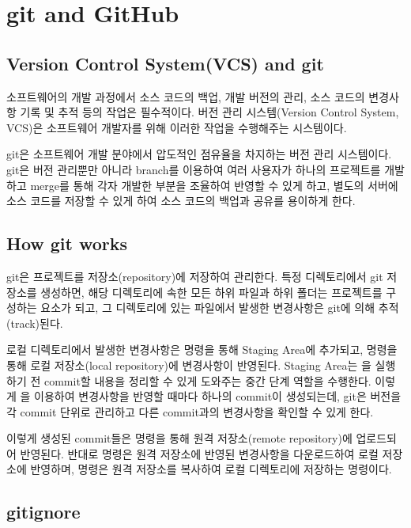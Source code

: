 \section{git and GitHub}\label{sect:git-and-github}

\subsection*{Version Control System(VCS) and git}

소프트웨어의 개발 과정에서 소스 코드의 백업, 개발 버전의 관리, 소스 코드의 변경사항 기록 및 추적 등의 작업은 필수적이다. 버전 관리 시스템(Version Control System, VCS)은 소프트웨어 개발자를 위해 이러한 작업을 수행해주는 시스템이다.

git은 소프트웨어 개발 분야에서 압도적인 점유율을 차지하는 버전 관리 시스템이다. git은 버전 관리뿐만 아니라 branch를 이용하여 여러 사용자가 하나의 프로젝트를 개발하고 merge를 통해 각자 개발한 부분을 조율하여 반영할 수 있게 하고, 별도의 서버에 소스 코드를 저장할 수 있게 하여 소스 코드의 백업과 공유를 용이하게 한다.

\subsection*{How git works}

git은 프로젝트를 저장소(repository)에 저장하여 관리한다. 특정 디렉토리에서 git 저장소를 생성하면, 해당 디렉토리에 속한 모든 하위 파일과 하위 폴더는 프로젝트를 구성하는 요소가 되고, 그 디렉토리에 있는 파일에서 발생한 변경사항은 git에 의해 추적(track)된다.

로컬 디렉토리에서 발생한 변경사항은  명령을 통해 Staging Area에 추가되고,  명령을 통해 로컬 저장소(local repository)에 변경사항이 반영된다. Staging Area는 을 실행하기 전 commit할 내용을 정리할 수 있게 도와주는 중간 단계 역할을 수행한다. 이렇게 을 이용하여 변경사항을 반영할 때마다 하나의 commit이 생성되는데, git은 버전을 각 commit 단위로 관리하고 다른 commit과의 변경사항을 확인할 수 있게 한다.

이렇게 생성된 commit들은  명령을 통해 원격 저장소(remote repository)에 업로드되어 반영된다. 반대로  명령은 원격 저장소에 반영된 변경사항을 다운로드하여 로컬 저장소에 반영하며,  명령은 원격 저장소를 복사하여 로컬 디렉토리에 저장하는 명령이다.


\subsection*{gitignore}

